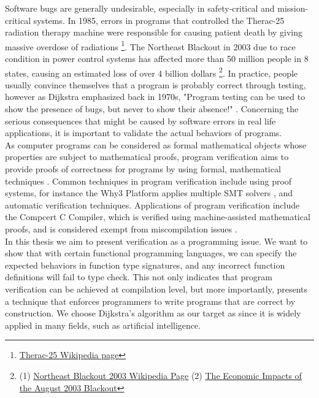 Software bugs are generally undesirable, especially in safety-critical and mission-critical systems. In 1985, errors in programs that controlled the Therac-25 radiation therapy machine were responsible for causing patient death by giving massive overdose of radiations \footnote{\href{https://en.wikipedia.org/wiki/Therac-25}{Therac-25 Wikipedia page}}. The Northeast Blackout in 2003 due to race condition in power control systems has affected more than 50 million people in 8 states, causing an estimated loss of over 4 billion dollars \footnote{(1) \href{https://en.wikipedia.org/wiki/Northeast_blackout_of_2003}{Northeast Blackout 2003 Wikipedia Page} (2) \href{https://elcon.org/wp-content/uploads/Economic20Impacts20of20August20200320Blackout1.pdf}{The Economic Impacts of the August 2003 Blackout}}. In practice, people usually convince themselves that a program is probably correct through testing, however as Dijkstra emphasized back in 1970s, "Program testing can be used to show the presence of bugs, but never to show their absence!" \cite{DijkstrasQuote}. Concerning the serious consequences that might be caused by software errors in real life applications, it is important to validate the actual behaviors of programs. 
\\

As computer programs can be considered as formal mathematical objects whose properties are subject to mathematical proofs, program verification aims to provide proofs of correctness for programs by using formal, mathematical techniques \cite{Moore}. Common techniques in program verification include using proof systems, for instance the Why3 Platform \cite{why3} applies multiple SMT solvers \cite{ergo} \cite{cvc4} \cite{z3}, and automatic verification techniques. Applications of program verification include the Compcert C Compiler, which is verified using machine-assisted mathematical proofs, and is considered exempt from miscompilation issues \cite{compcert}. 
\\

In this thesis we aim to present verification as a programming issue. We want to show that with certain functional programming languages, we can specify the expected behaviors in function type signatures, and any incorrect function definitions will fail to type check. This not only indicates that program verification can be achieved at compilation level, but more importantly, presents a technique that enforces programmers to write programs that are correct by construction. We choose Dijkstra's algorithm as our target as since it is widely applied in many fields, such as artificial intelligence. 
\\


